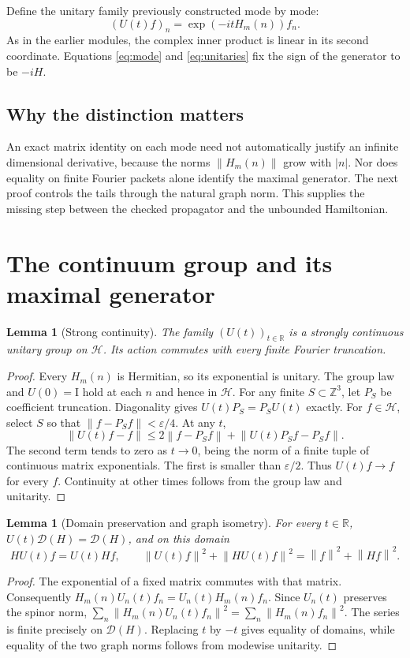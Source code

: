 \documentclass[11pt,oneside]{article}
\theoremstyle{kol}
\newtheorem{lemma}[theorem]{Lemma}
\theoremstyle{definition}
\newcommand{\Hu}{\mathcal H}
\newcommand{\Dn}{\mathcal D}
\newcommand{\R}{\mathbb R}
\newcommand{\Z}{\mathbb Z}
\newcommand{\Id}{\mathrm I}
\newcommand{\pp}[1]{\left\lVert#1\right\rVert}
\begin{document}
Define the unitary family previously constructed mode by mode:
\begin{equation}\label{eq:unitaries}
(U(t)f)_n=\exp(-itH_m(n))f_n.
\end{equation}
As in the earlier modules, the complex inner product is linear in its second coordinate. Equations \eqref{eq:mode} and \eqref{eq:unitaries} fix the sign of the generator to be $-iH$.

\subsection{Why the distinction matters}
An exact matrix identity on each mode need not automatically justify an infinite dimensional derivative, because the norms $\pp{H_m(n)}$ grow with $|n|$. Nor does equality on finite Fourier packets alone identify the maximal generator. The next proof controls the tails through the natural graph norm. This supplies the missing step between the checked propagator and the unbounded Hamiltonian.

\section{The continuum group and its maximal generator}
\begin{lemma}[Strong continuity]\label{lem:continuity}
The family $(U(t))_{t\in\R}$ is a strongly continuous unitary group on $\Hu$. Its action commutes with every finite Fourier truncation.
\end{lemma}
\begin{proof}
Every $H_m(n)$ is Hermitian, so its exponential is unitary. The group law and $U(0)=\Id$ hold at each $n$ and hence in $\Hu$. For any finite $S\subset\Z^3$, let $P_S$ be coefficient truncation. Diagonality gives $U(t)P_S=P_SU(t)$ exactly. For $f\in\Hu$, select $S$ so that $\pp{f-P_Sf}<\varepsilon/4$. At any $t$,
\[
\pp{U(t)f-f}\le 2\pp{f-P_S f}+\pp{U(t)P_Sf-P_Sf}.
\]
The second term tends to zero as $t\to0$, being the norm of a finite tuple of continuous matrix exponentials. The first is smaller than $\varepsilon/2$. Thus $U(t)f\to f$ for every $f$. Continuity at other times follows from the group law and unitarity.
\end{proof}

\begin{lemma}[Domain preservation and graph isometry]\label{lem:graph}
For every $t\in\R$, $U(t)\Dn(H)=\Dn(H)$, and on this domain
\[
HU(t)f=U(t)Hf,\qquad \pp{U(t)f}^2+\pp{HU(t)f}^2=\pp f^2+\pp{Hf}^2.
\]
\end{lemma}
\begin{proof}
The exponential of a fixed matrix commutes with that matrix. Consequently
$H_m(n)U_n(t)f_n=U_n(t)H_m(n)f_n$. Since $U_n(t)$ preserves the spinor norm, $\sum_n\pp{H_m(n)U_n(t)f_n}^2=\sum_n\pp{H_m(n)f_n}^2$. The series is finite precisely on $\Dn(H)$. Replacing $t$ by $-t$ gives equality of domains, while equality of the two graph norms follows from modewise unitarity.
\end{proof}
\end{document}
